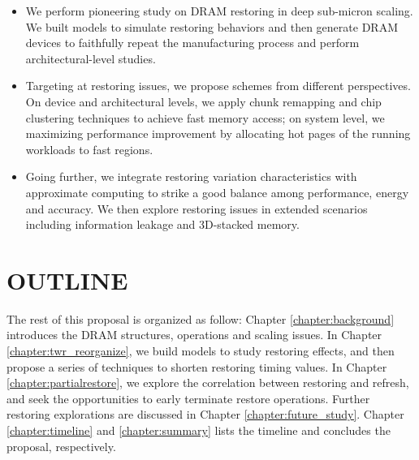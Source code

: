 \begin{itemize}
\item We perform pioneering study on DRAM restoring in deep sub-micron scaling. We built models to simulate restoring behaviors and then generate DRAM devices to faithfully repeat the manufacturing process  and perform architectural-level studies.
\item Targeting at restoring issues, we propose schemes from different perspectives. On device and architectural levels, we apply chunk remapping and chip clustering techniques to achieve fast memory access; on system level, we maximizing performance improvement by allocating hot pages of the running workloads to fast regions.
\item Going further, we integrate restoring variation characteristics with approximate computing to strike a good balance among performance, energy and accuracy. We then explore restoring issues in extended scenarios including information leakage and 3D-stacked memory.  
\end{itemize}


\section{OUTLINE}
\label{outline}
The rest of this proposal is organized as follow:  
Chapter \ref{chapter:background} introduces the DRAM structures, operations and scaling issues.
In Chapter \ref{chapter:twr_reorganize}, we build models to study restoring effects, and then propose a series of techniques to shorten restoring timing values.
In Chapter \ref{chapter:partialrestore}, we explore the correlation between restoring and refresh, and seek the opportunities to early terminate restore operations.
Further restoring explorations are discussed in Chapter \ref{chapter:future_study}.
Chapter \ref{chapter:timeline} and \ref{chapter:summary} lists the timeline and concludes the proposal, respectively.









